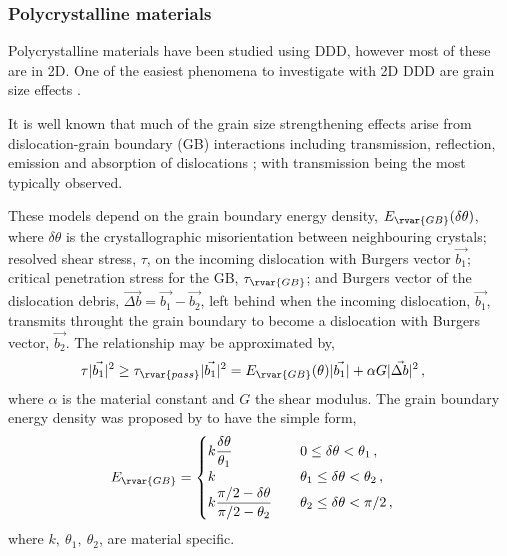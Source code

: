 \subsubsection{Polycrystalline materials}
\label{ss:polycrystal}

Polycrystalline materials have been studied using DDD, however most of these are in 2D. One of the easiest phenomena to investigate with 2D DDD are grain size effects \cite{2d_pcm, 2d_pcm2}.

It is well known that much of the grain size strengthening effects arise from dislocation-grain boundary (GB) interactions including transmission, reflection, emission and absorption of dislocations \cite{grain_size_eff1, grain_size_eff2}; with transmission being the most typically observed.

These models depend on the grain boundary energy density, $ E_{\rvar{GB}}(\delta\theta) $, where $ \delta\theta $ is the crystallographic misorientation between neighbouring crystals; resolved shear stress, $ \tau $, on the incoming dislocation with Burgers vector $ \vec{b_{1}} $; critical penetration stress for the GB, $ \tau_{\rvar{GB}} $; and Burgers vector of the dislocation debris, $ \vec{\Delta b} = \vec{b_{1}} - \vec{b_{2}} $, left behind when the incoming dislocation, $ \vec{b_{1}} $, transmits throught the grain boundary to become a dislocation with Burgers vector, $ \vec{b_{2}} $. The relationship may be approximated by,
\begin{align}\label{eq:dln_trns}
  \tau \lvert\vec{b_{1}}\rvert^{2} & \geq \tau_{\rvar{pass}} \lvert\vec{b_{1}}\rvert^{2} = E_{\rvar{GB}}(\theta) \lvert\vec{b_{1}}\rvert + \alpha G \lvert\vec{\Delta b}\rvert^{2}\,,
\end{align}
where $ \alpha $ is the material constant and $ G $ the shear modulus. The grain boundary energy density was proposed by \citet{gb_e_dens} to have the simple form,
\begin{align}
  E_{\rvar{GB}} & = 	\begin{cases}
    k \dfrac{\delta\theta}{\theta_{1}}                 & \quad 0 \leq \delta\theta < \theta_{1}\,,          \\
    k                                                  & \quad \theta_{1} \leq \delta\theta < \theta_{2}\,, \\
    k \dfrac{\pi/2 - \delta\theta}{\pi/2 - \theta_{2}} & \quad \theta_{2} \leq \delta\theta < \pi/2\,,
  \end{cases}
\end{align}
where $ k,~ \theta_{1},~\theta_{2} $, are material specific.

